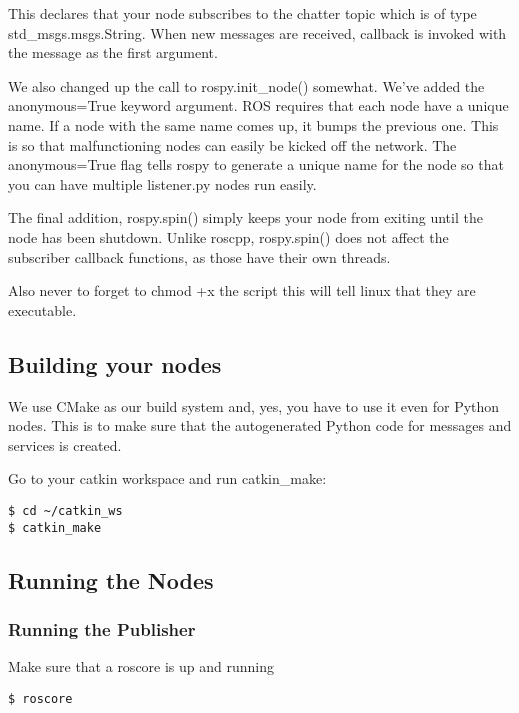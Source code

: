 This declares that your node subscribes to the chatter topic which is of type std\_msgs.msgs.String. When new messages are received, callback is invoked with the message as the first argument.

We also changed up the call to rospy.init\_node() somewhat. We've added the anonymous=True keyword argument. ROS requires that each node have a unique name. If a node with the same name comes up, it bumps the previous one. This is so that malfunctioning nodes can easily be kicked off the network. The anonymous=True flag tells rospy to generate a unique name for the node so that you can have multiple listener.py nodes run easily.

The final addition, rospy.spin() simply keeps your node from exiting until the node has been shutdown. Unlike roscpp, rospy.spin() does not affect the subscriber callback functions, as those have their own threads.

Also never to forget to chmod +x the script this will tell linux that they are executable.

\subsection{Building your nodes}

We use CMake as our build system and, yes, you have to use it even for Python nodes. This is to make sure that the autogenerated Python code for messages and services is created.



Go to your catkin workspace and run catkin\_make:

\begin{lstlisting}[breaklines=true languages=bash]
$ cd ~/catkin_ws
$ catkin_make
\end{lstlisting}

\subsection{Running the Nodes}
\subsubsection{Running the Publisher}

Make sure that a roscore is up and running

\begin{lstlisting}[breaklines=true languages=bash]
$ roscore
\end{lstlisting}

